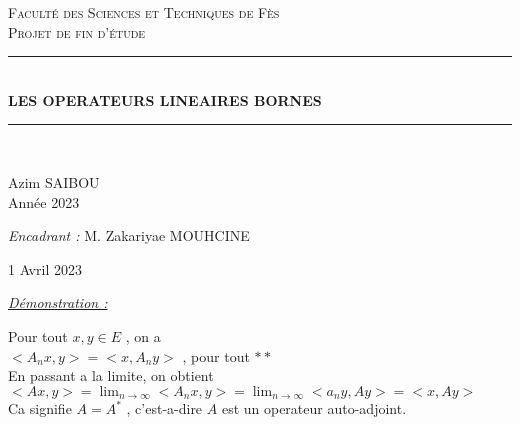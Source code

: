 \documentclass[a4paper, 12pt]{report}
\newcommand{\HRule}{\rule{\linewidth}{0.5mm}}
\begin{document}
\sffamily


\begin{titlepage}
\begin{center}
\textsc{\LARGE Faculté des Sciences et Techniques de Fès}\\[2cm]
\textsc{\Large Projet de fin d'étude}\\[1.5cm]
\HRule \\[0.4cm] { \huge \bfseries LES OPERATEURS LINEAIRES BORNES\\[0.4cm] }
\HRule \\[0.4cm]
\begin{minipage}{0.4\textwidth}
\begin{flushleft} \large Azim \textsc{SAIBOU}\\ Année 2023\\
\end{flushleft}
\end{minipage}
\begin{minipage}{0.4\textwidth}
\begin{flushright} \large \emph{Encadrant :} M. Zakariyae MOUHCINE\\
\end{flushright}
\end{minipage}
\vfill {\large 1\ier{} Avril 2023}
\end{center}
\end{titlepage}



\newpage
	

\tableofcontents
\newpage


\newtheorem{Def}{Définition}[subsection]
\newtheorem{Ex}{Exemple}[subsection]
\newtheorem{The}{Théorème}[subsection]
\newtheorem{Prop}{Proposion}[subsection]
\newtheorem{Lem}{Lemme}[subsection]
\newtheorem{Cor}{Corollaire}[subsection]
\newtheorem{Rem}{Remarque}[subsection]
\addto{}






\begin{center}
\underline{\textit{Démonstration :}}
\end{center}
Pour tout $x, y \in E$ , on a \\
					 $< A_nx,y > = < x,A_ny >$ , pour tout $**$ \\
En passant a la limite, on obtient \\
					 $< Ax,y > = \lim_{n\rightarrow \infty} < A_nx,y > = \lim_{n\rightarrow \infty} < a_ny,Ay > = < x,Ay >$ \\
Ca signifie $A = A^*$ , c'est-a-dire $A$ est un operateur auto-adjoint. \\
\end{document}
